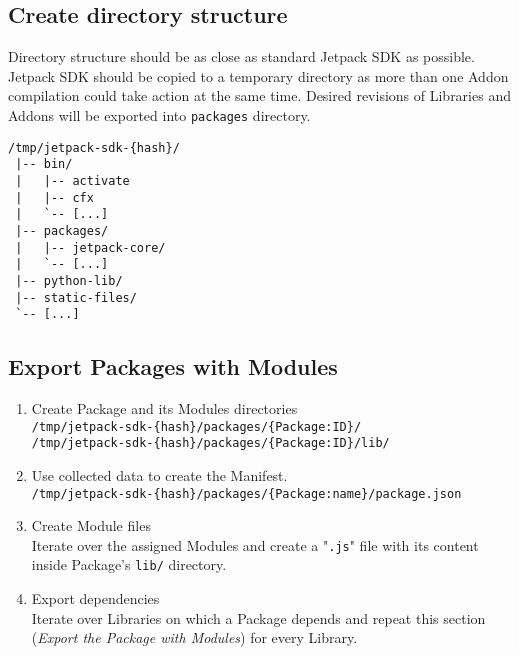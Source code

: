 \documentclass[10pt]{article}
\begin{document}
	\subsection{Create directory structure}
		
		Directory structure should be as close as standard Jetpack SDK as possible. Jetpack SDK should 
		be copied to a temporary directory as more than one Addon compilation could take action at the 
		same time. Desired revisions of Libraries and Addons will be exported into {\tt packages} directory.
		
		\begin{lstlisting}[caption=Parts of the tree of a copied Jetpack SDK directory.]
 /tmp/jetpack-sdk-{hash}/
 |-- bin/
 |   |-- activate
 |   |-- cfx
 |   `-- [...]
 |-- packages/
 |   |-- jetpack-core/
 |   `-- [...]
 |-- python-lib/
 |-- static-files/
 `-- [...]
		\end{lstlisting}
	
		
	
	\subsection{Export Packages with Modules}
		
		\begin{enumerate}
			\item{Create Package and its Modules directories\\
				{\tt /tmp/jetpack-sdk-\{hash\}/packages/\{Package:ID\}/}\\
				{\tt /tmp/jetpack-sdk-\{hash\}/packages/\{Package:ID\}/lib/}
			}
			\item{Use collected data to create the Manifest.\\
				{\tt /tmp/jetpack-sdk-\{hash\}/packages/\{Package:name\}/package.json}
			}
			\item{Create Module files\\
				Iterate over the assigned Modules and create a "{\tt .js}" file with its content inside 
				Package's {\tt lib/} directory.
			}
			\item{Export dependencies\\
				Iterate over Libraries on which a Package depends and repeat this section ({\em Export 
				the Package with Modules}) for every Library.
			}
		\end{enumerate}
	
\end{document}
